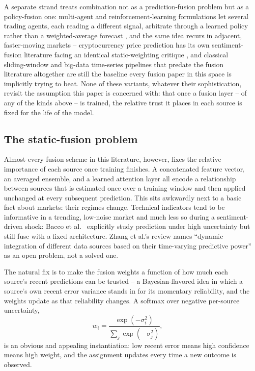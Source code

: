 \documentclass[10pt,a4paper,twocolumn]{article}
\begin{document}
A separate strand treats combination not as a prediction-fusion problem but as a policy-fusion one: multi-agent and reinforcement-learning formulations let several trading agents, each reading a different signal, arbitrate through a learned policy rather than a weighted-average forecast \cite{lee2007}, and the same idea recurs in adjacent, faster-moving markets -- cryptocurrency price prediction has its own sentiment-fusion literature facing an identical static-weighting critique \cite{parekh2022}, and classical sliding-window and big-data time-series pipelines that predate the fusion literature altogether \cite{chou2018,wang2020tsmining} are still the baseline every fusion paper in this space is implicitly trying to beat. None of these variants, whatever their sophistication, revisit the assumption this paper is concerned with: that once a fusion layer -- of any of the kinds above -- is trained, the relative trust it places in each source is fixed for the life of the model.

\subsection{The static-fusion problem}

Almost every fusion scheme in this literature, however, fixes the relative importance of each source once training finishes. A concatenated feature vector, an averaged ensemble, and a learned attention layer all encode a relationship between sources that is estimated once over a training window and then applied unchanged at every subsequent prediction. This sits awkwardly next to a basic fact about markets: their regimes change. Technical indicators tend to be informative in a trending, low-noise market and much less so during a sentiment-driven shock: Bacco et al.\ \cite{bacco2024} explicitly study prediction under high uncertainty but still fuse with a fixed architecture. Zhang et al.'s review \cite{zhang2022} names ``dynamic integration of different data sources based on their time-varying predictive power'' as an open problem, not a solved one.

The natural fix is to make the fusion weights a function of how much each source's recent predictions can be trusted -- a Bayesian-flavored idea in which a source's own recent error variance stands in for its momentary reliability, and the weights update as that reliability changes. A softmax over negative per-source uncertainty,
\[
w_i = \frac{\exp(-\sigma_i^2)}{\sum_j \exp(-\sigma_j^2)},
\]
is an obvious and appealing instantiation: low recent error means high confidence means high weight, and the assignment updates every time a new outcome is observed.
\end{document}
